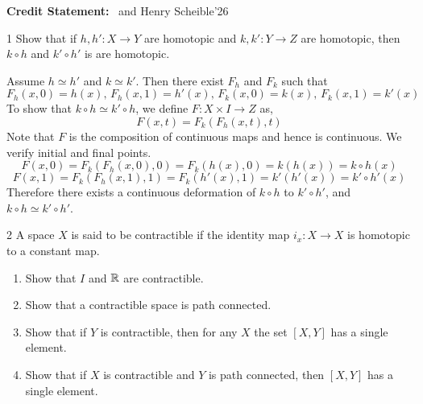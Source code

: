\documentclass[12pt]{article}
\begin{document}


\vspace{.1in}

\textbf{Credit Statement:} \tism \, and Henry Scheible'26

\begin{problem}{1}
    Show that if $h, h': X \to Y$ are homotopic and $k, k': Y\to Z$ are homotopic, then $k \circ h$ and $k' \circ h'$ is are homotopic. 
\end{problem}

\begin{solution}
    \bbni

    Assume $h \simeq h'$ and $k \simeq k'$. Then there exist $F_h$ and $F_k$ such that 
    \[F_h(x,0) = h(x), \, F_h(x,1) = h'(x), \, F_k(x,0) = k(x), \, F_k(x,1) = k'(x)\]
    To show that $k \circ h \simeq k' \circ h$, we define $F:X \times I \to Z$ as,
    \[F(x,t) = F_k (F_h(x,t), t)\]
    Note that $F$ is the composition of continuous maps and hence is continuous. We verify initial and final points.  
    \[F(x,0) = F_k(F_h(x, 0),0) = F_k(h(x), 0) = k(h(x)) = k \circ h (x)\]
    \[F(x,1) = F_k(F_h(x, 1),1) = F_k(h'(x), 1) = k'(h'(x)) = k' \circ h' (x)\]
    Therefore there exists a continuous deformation of $k \circ h$ to $k' \circ h'$, and $k \circ h \simeq k' \circ h'$. 
\end{solution}

\newpage

\begin{problem}{2}
    A space $X$ is said to be contractible if the identity map $i_x: X\to X$ is homotopic to a constant map. 
    \begin{enumerate}
        \item Show that $I$ and $\mathbb R$ are contractible. 
        \item Show that a contractible space is path connected. 
        \item Show that if $Y$ is contractible, then for any $X$ the set $[X, Y]$ has a single element. 
        \item Show that if $X$ is contractible and $Y$ is path connected, then $[X, Y]$ has a single element. 
    \end{enumerate}
\end{problem}
\end{document}
